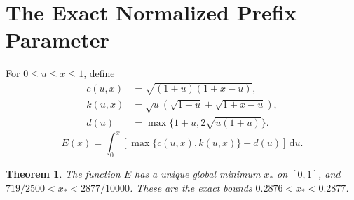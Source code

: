 \documentclass[11pt,letterpaper]{article}
\newtheorem{theorem}{Theorem}[section]
\newcommand{\dd}{\,\mathrm d}
\begin{document}
\section{The Exact Normalized Prefix Parameter}\label{sec:x}
For $0\le u\le x\le1$, define
\begin{align*}
 c(u,x)&=\sqrt{(1+u)(1+x-u)},\\
 k(u,x)&=\sqrt u(\sqrt{1+u}+\sqrt{1+x-u}),\\
 d(u)&=\max\{1+u,2\sqrt{u(1+u)}\}.
\end{align*}
\begin{equation}\label{eq:E}
 E(x)=\int_0^x[\max\{c(u,x),k(u,x)\}-d(u)]\dd u.
\end{equation}
\begin{theorem}\label{thm:x}
The function $E$ has a unique global minimum $x_*$ on $[0,1]$, and
$719/2500<x_*<2877/10000$. These are the exact bounds
$0.2876<x_*<0.2877$.
\end{theorem}
\end{document}
